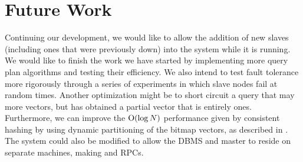 \section{Future Work}
Continuing our development, we would like to allow the addition of new slaves
(including ones that were previously down) into the system while it is running.
We would like to finish the work we have started by implementing more
query plan algorithms and testing their efficiency. We also intend to test
fault tolerance more rigorously through a series of experiments in which
slave nodes fail at random times. Another optimization might be to short
circuit a query that may  more vectors, but has obtained a partial
vector that is entirely ones. Furthermore, we can improve the
\(\mathrm{O}(\log{N})\) performance given by consistent hashing by using dynamic
partitioning of the bitmap vectors, as described in \cite{kleppman2017}.
The system could also be modified to allow the DBMS and master to reside on separate machines, making
 and  RPCs.
